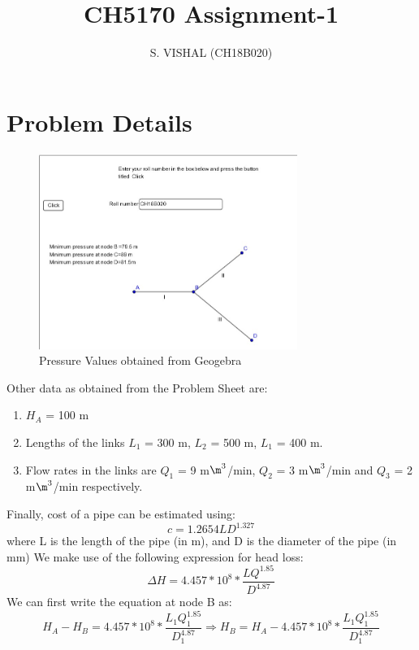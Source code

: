 \documentclass{homework}
\title{CH5170 Assignment-1}
\author{S. VISHAL (CH18B020)}
\begin{document}
\maketitle
\section{Problem Details}
\begin{figure}[ht]
\centering
\includegraphics[width=0.75\textwidth]{question.jpg}
\caption{Pressure Values obtained from Geogebra}
\end{figure}
Other data as obtained from the Problem Sheet are:
\begin{enumerate}
\item $H_A$ = 100 m
\item Lengths of the links $L_{1}$ = 300 m, $L_{2}$ = 500 m, $L_{1}$ = 400 m. \item Flow rates in the links are $Q_1$ = 9 m$\m^3$/min, $Q_2$ = 3 m$\m^3$/min and $Q_3$ = 2 m$\m^3$/min respectively.
\end{enumerate}
Finally, cost of a pipe can be estimated using:
\begin{equation}\label{pipe_cost}
c = 1.2654LD^{1.327}
\end{equation}
where L is the length of the pipe (in m), and D is the diameter of the pipe (in mm)
We make use of the following expression for head loss:
\begin{equation}\label{head_loss}
\Delta H = 4.457*10^8*\frac{LQ^{1.85}}{D^{4.87}}
\end{equation}
We can first write the equation at node B as:
\begin{equation}\label{node_B_Pressure}
H_A - H_B = 4.457*10^8*\frac{L_1Q_1^{1.85}}{D_1^{4.87}}
\Rightarrow{H_B = H_A - 4.457*10^8*\frac{L_1Q_1^{1.85}}{D_1^{4.87}}}
\end{equation}
\end{document}
